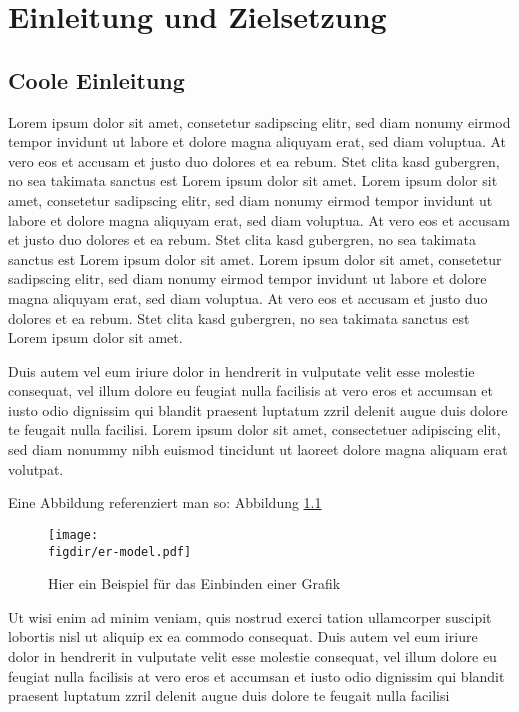 \chapter{Einleitung und Zielsetzung}
\label{chap:Einleitung und Zielsetzung}
\section{Coole Einleitung}
\label{sec:Coole Einleitung}
Lorem ipsum dolor sit amet, consetetur sadipscing elitr, sed diam nonumy eirmod tempor invidunt ut labore et dolore magna aliquyam erat, sed diam voluptua. At vero eos et accusam et justo duo dolores et ea rebum. Stet clita kasd gubergren, no sea takimata sanctus est Lorem ipsum dolor sit amet. Lorem ipsum dolor sit amet, consetetur sadipscing elitr, sed diam nonumy eirmod tempor invidunt ut labore et dolore magna aliquyam erat, sed diam voluptua. At vero eos et accusam et justo duo dolores et ea rebum. Stet clita kasd gubergren, no sea takimata sanctus est Lorem ipsum dolor sit amet. Lorem ipsum dolor sit amet, consetetur sadipscing elitr, sed diam nonumy eirmod tempor invidunt ut labore et dolore magna aliquyam erat, sed diam voluptua. At vero eos et accusam et justo duo dolores et ea rebum. Stet clita kasd gubergren, no sea takimata sanctus est Lorem ipsum dolor sit amet.

Duis autem vel eum iriure dolor in hendrerit in vulputate velit esse molestie consequat, vel illum dolore eu feugiat nulla facilisis at vero eros et accumsan et iusto odio dignissim qui blandit praesent luptatum zzril delenit augue duis dolore te feugait nulla facilisi. Lorem ipsum dolor sit amet, consectetuer adipiscing elit, sed diam nonummy nibh euismod tincidunt ut laoreet dolore magna aliquam erat volutpat.

Eine Abbildung referenziert man so: Abbildung \ref{fig:bsp}

\begin{figure}[ht]
\centering
\caption{Hier ein Beispiel für das Einbinden einer Grafik}
\label{fig:bsp}
\texttt{[image: \\figdir/er-model.pdf]}
\end{figure}

Ut wisi enim ad minim veniam, quis nostrud exerci tation ullamcorper suscipit lobortis nisl ut aliquip ex ea commodo consequat. Duis autem vel eum iriure dolor in hendrerit in vulputate velit esse molestie consequat, vel illum dolore eu feugiat nulla facilisis at vero eros et accumsan et iusto odio dignissim qui blandit praesent luptatum zzril delenit augue duis dolore te feugait nulla facilisi

